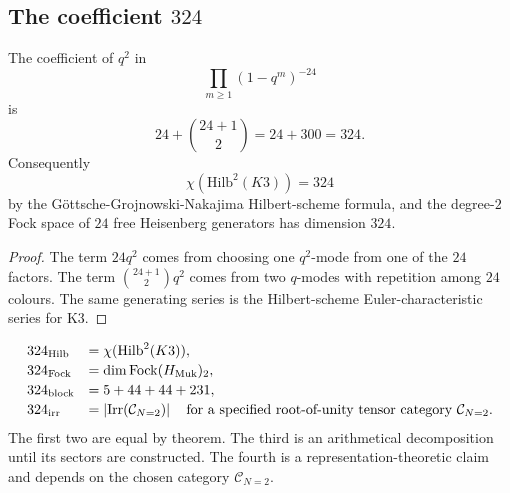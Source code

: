 \subsection{The coefficient \texorpdfstring{$324$}{324}}
\label{subsec:qtet-324}

\begin{proposition}
\label{prop:qtet-324-gottsche-fock}
The coefficient of \(q^2\) in
\[
  \prod_{m\geq 1}(1-q^m)^{-24}
\]
is
\[
  24+\binom{24+1}{2}=24+300=324.
\]
Consequently
\[
  \chi(\mathrm{Hilb}^2(K3))=324
\]
by the G\"ottsche-Grojnowski-Nakajima Hilbert-scheme formula, and
the degree-\(2\) Fock space of \(24\) free Heisenberg generators has
dimension \(324\).
\end{proposition}

\begin{proof}
The term \(24q^2\) comes from choosing one \(q^2\)-mode from one of
the \(24\) factors.  The term \(\binom{24+1}{2}q^2\) comes from two
\(q\)-modes with repetition among \(24\) colours.  The same generating
series is the Hilbert-scheme Euler-characteristic series for K3.
\end{proof}

\begin{definition}
\label{def:qtet-four-324s}
\[
\begin{array}{ll}
324_{\mathrm{Hilb}} &
  = \chi(\mathrm{Hilb}^2(K3)),\\[2pt]
324_{\mathrm{Fock}} &
  = \dim \mathrm{Fock}(H_{\mathrm{Muk}})_2,\\[2pt]
324_{\mathrm{block}} &
  = 5+44+44+231,\\[2pt]
324_{\mathrm{irr}} &
  = \left|\mathrm{Irr}(\mathcal C_{N=2})\right|
  \quad\text{for a specified root-of-unity tensor category }
  \mathcal C_{N=2}.
\end{array}
\]
The first two are equal by theorem.  The third is an arithmetical
decomposition until its sectors are constructed.  The fourth is a
representation-theoretic claim and depends on the chosen category
\(\mathcal C_{N=2}\).
\end{definition}

